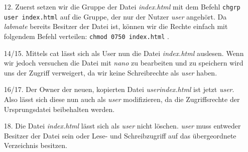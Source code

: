 \documentclass{scrartcl}
\begin{document}
\begin{enumerate}[1.]
      \item [12.] Zuerst setzen wir die Gruppe der Datei \textit{index.html} mit dem Befehl
            \texttt{chgrp user index.html} auf die Gruppe, der nur der Nutzer
            \textit{user} angehört. Da \textit{labmate} bereits Besitzer der Datei
            ist, können wir die Rechte einfach mit folgendem Befehl verteilen:
            \texttt{chmod 0750 index.html} .
      \item [14/15.] Mittels cat lässt sich als User nun die Datei \textit{index.html}
            auslesen. Wenn wir jedoch versuchen die Datei mit \textit{nano} zu
            bearbeiten und zu speichern wird uns der Zugriff verweigert, da wir
            keine Schreibrechte als \textit{user} haben.
      \item [16/17.] Der Owner der neuen, kopierten Datei \textit{userindex.html}
            ist jetzt \textit{user}. Also lässt sich diese nun auch als \textit{user}
            modifizieren, da die Zugriffsrechte der Ursprungsdatei beibehalten werden.
      \item [18.] Die Datei \textit{index.html} lässt sich als \textit{user} nicht
            löschen. \textit{user} muss entweder Besitzer der Datei sein oder
            Lese- und Schreibzugriff auf das übergeordnete Verzeichnis besitzen.
    \end{enumerate}
\end{document}
